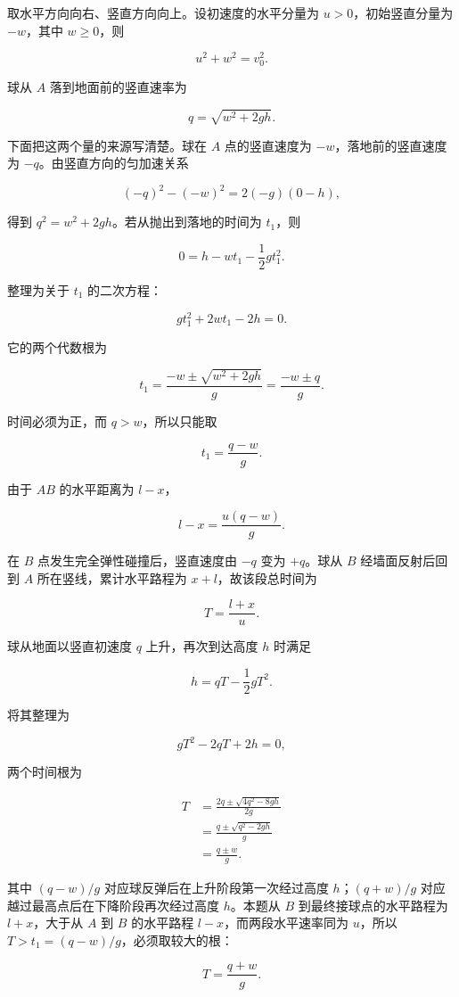 \documentclass[12pt,a4paper,UTF8]{ctexart}
\begin{document}
取水平方向向右、竖直方向向上。设初速度的水平分量为
\(u>0\)，初始竖直分量为 \(-w\)，其中 \(w\geq 0\)，则

\[u^2+w^2=v_0^2.\]

球从 \(A\) 落到地面前的竖直速率为

\[q=\sqrt{w^2+2gh}.\]

下面把这两个量的来源写清楚。球在 \(A\) 点的竖直速度为
\(-w\)，落地前的竖直速度为 \(-q\)。由竖直方向的匀加速关系

\[(-q)^2-(-w)^2=2(-g)(0-h),\]

得到 \(q^2=w^2+2gh\)。若从抛出到落地的时间为 \(t_1\)，则

\[0=h-wt_1-\frac12gt_1^2.\]

整理为关于 \(t_1\) 的二次方程：

\[gt_1^2+2wt_1-2h=0.\]

它的两个代数根为

\[t_1=\frac{-w\pm\sqrt{w^2+2gh}}{g}
=\frac{-w\pm q}{g}.\]

时间必须为正，而 \(q>w\)，所以只能取

\[t_1=\frac{q-w}{g}.\]

由于 \(AB\) 的水平距离为 \(l-x\)，

\[l-x=\frac{u(q-w)}{g}. \tag{1}\]

在 \(B\) 点发生完全弹性碰撞后，竖直速度由 \(-q\) 变为 \(+q\)。球从 \(B\)
经墙面反射后回到 \(A\) 所在竖线，累计水平路程为 \(x+l\)，故该段总时间为

\[T=\frac{l+x}{u}.\]

球从地面以竖直初速度 \(q\) 上升，再次到达高度 \(h\) 时满足

\[h=qT-\frac12gT^2.\]

将其整理为

\[gT^2-2qT+2h=0,\]

两个时间根为

\[\begin{aligned}
T
&=\frac{2q\pm\sqrt{4q^2-8gh}}{2g}\\
&=\frac{q\pm\sqrt{q^2-2gh}}{g}\\
&=\frac{q\pm w}{g}.
\end{aligned}\]

其中 \((q-w)/g\) 对应球反弹后在上升阶段第一次经过高度 \(h\)；\((q+w)/g\)
对应越过最高点后在下降阶段再次经过高度 \(h\)。本题从 \(B\)
到最终接球点的水平路程为 \(l+x\)，大于从 \(A\) 到 \(B\) 的水平路程
\(l-x\)，而两段水平速率同为 \(u\)，所以
\(T>t_1=(q-w)/g\)，必须取较大的根：

\[T=\frac{q+w}{g}.\]
\end{document}
